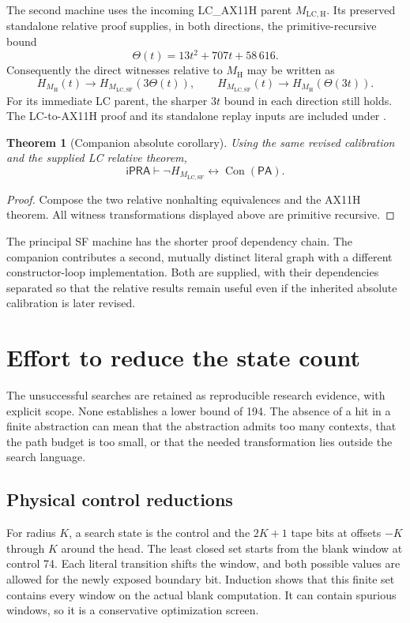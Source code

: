 \documentclass[11pt,letterpaper]{article}
\newtheorem{theorem}{Theorem}
\newcommand{\ipra}{\mathsf{iPRA}}
\newcommand{\PA}{\mathsf{PA}}
\newcommand{\Con}{\operatorname{Con}}
\newcommand{\Mtwo}{M_{\mathrm{LC,SF}}}
\newcommand{\MH}{M_{\mathrm H}}
\newcommand{\MLH}{M_{\mathrm{LC,H}}}
\newcommand{\file}[1]{\path{#1}}
\begin{document}
The second machine uses the incoming LC\_AX11H parent $\MLH$. Its preserved
standalone relative proof supplies, in both directions, the primitive-recursive
bound
\[
 \Theta(t)=13t^2+707t+58\,616.
\]
Consequently the direct witnesses relative to $\MH$ may be written as
\[
 H_{\MH}(t)\to H_{\Mtwo}(3\Theta(t)),\qquad
 H_{\Mtwo}(t)\to H_{\MH}(\Theta(3t)).
\]
For its immediate LC parent, the sharper $3t$ bound in each direction
still holds. The LC-to-AX11H proof and its standalone replay inputs are
included under \file{references/lc_ax11h/}.

\begin{theorem}[Companion absolute corollary]
Using the same revised calibration and the supplied LC relative theorem,
\[
 \boxed{\ipra\vdash\neg H_{\Mtwo}\leftrightarrow\Con(\PA).}
\]
\end{theorem}
\begin{proof}
Compose the two relative nonhalting equivalences and the AX11H theorem.
All witness transformations displayed above are primitive recursive.
\end{proof}

The principal SF machine has the shorter proof dependency chain. The
companion contributes a second, mutually distinct literal graph with a
different constructor-loop implementation. Both are supplied, with their
dependencies separated so that the relative results remain useful even
if the inherited absolute calibration is later revised.

\section{Effort to reduce the state count}\label{sec:search}

The unsuccessful searches are retained as reproducible research evidence,
with explicit scope. None establishes a lower bound of 194. The absence
of a hit in a finite abstraction can mean that the abstraction admits
too many contexts, that the path budget is too small, or that the needed
transformation lies outside the search language.

\subsection{Physical control reductions}

For radius $K$, a search state is the control and the $2K+1$ tape bits
at offsets $-K$ through $K$ around the head. The least closed set starts
from the blank window at control 74. Each literal transition shifts the
window, and both possible values are allowed for the newly exposed
boundary bit. Induction shows that this finite set contains every window
on the actual blank computation. It can contain spurious windows, so it
is a conservative optimization screen.
\end{document}
